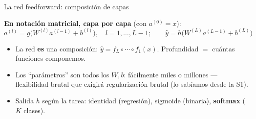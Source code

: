\documentclass{beamer}
\newcommand{\1}{\mathbb{I}}
\begin{document}
\begin{frame}{La red feedforward: composición de capas}
\small
\begin{center}
\end{center}
\pause

\textbf{En notación matricial, capa por capa} (con $a^{(0)} = x$):
\[ a^{(l)} = g\big( W^{(l)} a^{(l-1)} + b^{(l)} \big), \quad l = 1, \ldots, L-1; \qquad \hat{y} = h\big( W^{(L)} a^{(L-1)} + b^{(L)} \big) \]
\pause

\begin{itemize}\itemsep3pt
  \item La red \textbf{es} una composición: $\hat{y} = f_L \circ \cdots \circ f_1(x)$. Profundidad $=$ cuántas funciones componemos.
  \item Los ``parámetros'' son todos los $W, b$: fácilmente miles o millones --- flexibilidad brutal que exigirá regularización brutal (lo sabíamos desde la S1).
  \item Salida $h$ según la tarea: identidad (regresión), sigmoide (binaria), \textbf{softmax} ($K$ clases).
\end{itemize}
\end{frame}
\end{document}
